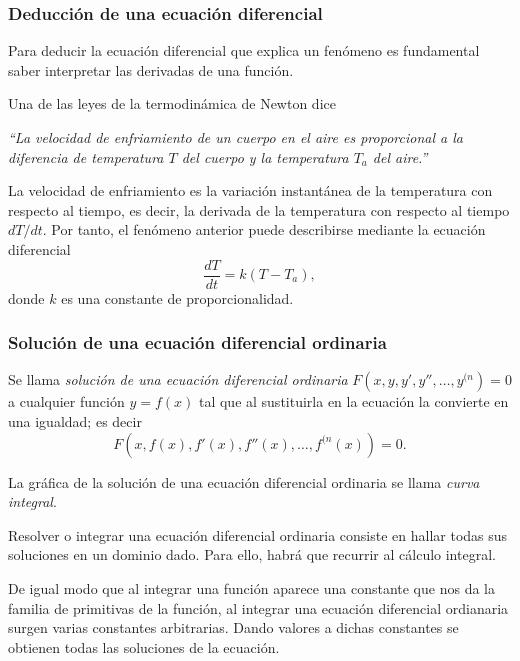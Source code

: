 \begin{frame}
\frametitle{Deducción de una ecuación diferencial}
Para deducir la ecuación diferencial que explica un fenómeno es fundamental saber interpretar las derivadas de una función.

 Una de las leyes de la termodinámica de Newton dice
\begin{center}
\begin{minipage}{0.8\textwidth}
\textit{``La velocidad de enfriamiento de un cuerpo en el aire es proporcional a la diferencia de temperatura $T$ del cuerpo y la temperatura $T_a$ del aire.''}
\end{minipage}
\end{center}
La velocidad de enfriamiento es la variación instantánea de la temperatura con respecto al tiempo, es decir, la derivada de la temperatura con respecto al tiempo $dT/dt$.
Por tanto, el fenómeno anterior puede describirse mediante la ecuación diferencial
\[
\frac{dT}{dt}=k(T-T_a),
\]
donde $k$ es una constante de proporcionalidad. 
\end{frame}



\begin{frame}
\frametitle{Solución de una ecuación diferencial ordinaria}
\begin{definicion}
Se llama \emph{solución de una ecuación diferencial ordinaria} $F(x,y,y',y'',\ldots,y^{(n})=0$ a cualquier función $y =f(x)$ tal que al sustituirla en la ecuación la convierte en una igualdad; es decir 
\[
F(x,f(x), f'(x), f''(x),\ldots, f^{(n}(x))=0.
\]

La gráfica de la solución de una ecuación diferencial ordinaria se llama \emph{curva integral}.
\end{definicion}

Resolver o integrar una ecuación diferencial ordinaria consiste en hallar todas sus soluciones en un dominio dado. Para ello, habrá que recurrir al cálculo integral.

De igual modo que al integrar una función aparece una constante que nos da la familia de primitivas de la función,  al integrar una ecuación diferencial ordianaria surgen varias constantes arbitrarias. Dando valores a dichas constantes se obtienen todas las soluciones de la ecuación.
\end{frame}


